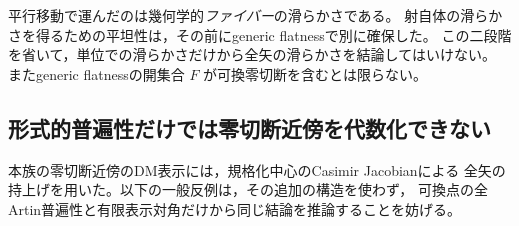 \begin{remark}\label{rem:flatness-before-fiber-translation}
平行移動で運んだのは幾何学的\emph{ファイバー}の滑らかさである。
射自体の滑らかさを得るための平坦性は，その前にgeneric flatnessで別に確保した。
この二段階を省いて，単位での滑らかさだけから全矢の滑らかさを結論してはいけない。
またgeneric flatnessの開集合 $F$ が可換零切断を含むとは限らない。
\end{remark}

\subsection{形式的普遍性だけでは零切断近傍を代数化できない}

本族の零切断近傍のDM表示には，規格化中心のCasimir Jacobianによる
全矢の持上げを用いた。以下の一般反例は，その追加の構造を使わず，
可換点の全Artin普遍性と有限表示対角だけから同じ結論を推論することを妨げる。

